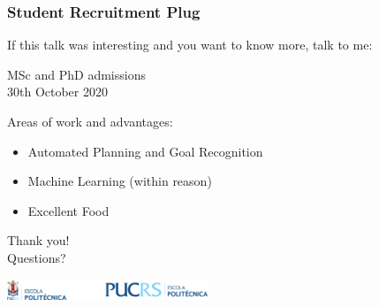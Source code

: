 \documentclass[usenames,dvipsnames]{beamer}
\begin{document}

\begin{frame}[c]\frametitle{Student Recruitment Plug}
	If this talk was interesting and you want to know more, talk to me:\\[2em]
	\begin{center}
		{\Large
		MSc and PhD admissions \\[2em] 30th October 2020
		}
	\end{center}
	Areas of work and advantages:
	\begin{itemize}
		\item Automated Planning and Goal Recognition
		\item Machine Learning (within reason)
		\item Excellent Food
	\end{itemize}
\end{frame}



	{
    \begin{frame}[c]{}
    		\centering
    		Thank you!
			\\
			Questions?
			\begin{center}
				\includegraphics[width=6cm]{politecnica.pdf}
			\end{center}
    \end{frame}
    }

\end{document}
